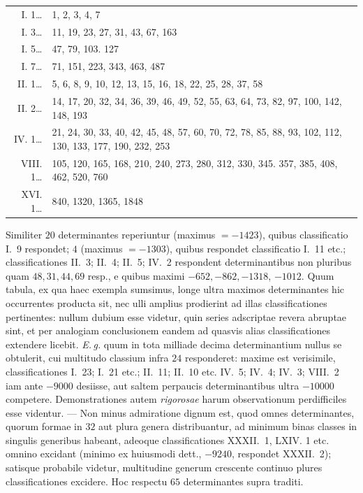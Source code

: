 \begin{center}\begin{tabularx}{\textwidth}{@{}r@{\quad}X@{}}
I. 1\;\ldots & 1, 2, 3, 4, 7\\[2pt]
I. 3\;\ldots & 11, 19, 23, 27, 31, 43, 67, 163\\[2pt]
I. 5\;\ldots & 47, 79, 103. 127\\[2pt]
I. 7\;\ldots & 71, 151, 223, 343, 463, 487\\[2pt]
II. 1\;\ldots & 5, 6, 8, 9, 10, 12, 13, 15, 16, 18, 22, 25, 28, 37, 58\\[2pt]
II. 2\;\ldots & 14, 17, 20, 32, 34, 36, 39, 46, 49, 52, 55, 63, 64, 73, 82, 97, 100, 142, 148, 193\\[2pt]
IV. 1\;\ldots & 21, 24, 30, 33, 40, 42, 45, 48, 57, 60, 70, 72, 78, 85, 88, 93, 102, 112, 130, 133, 177, 190, 232, 253\\[2pt]
VIII. 1\;\ldots & 105, 120, 165, 168, 210, 240, 273, 280, 312, 330, 345. 357, 385, 408, 462, 520, 760\\[2pt]
XVI. 1\;\ldots & 840, 1320, 1365, 1848\\[2pt]
\end{tabularx}\end{center}
Similiter \(20\) determinantes reperiuntur (maximus \(=-1423\)), quibus classificatio I.~9 respondet; \(4\) (maximus \(=-1303\)), quibus respondet classificatio I.~11 etc.; classificationes II.~3; II.~4; II.~5; IV.~2 respondent determinantibus non pluribus quam \(48,31,44,69\) resp., e quibus maximi \(-652,-862,-1318\), \(-1012\). Quum tabula, ex qua haec exempla sumsimus, longe ultra maximos determinantes hic occurrentes producta sit, nec ulli amplius prodierint ad illas classificationes pertinentes: nullum dubium esse videtur, quin series adscriptae revera abruptae sint, et per analogiam conclusionem eandem ad quasvis alias classificationes extendere licebit. \textit{E.\,g.} quum in tota milliade decima determinantium nullus se obtulerit, cui multitudo classium infra \(24\) responderet: maxime est verisimile, classificationes I.~23; I.~21 etc.; II.~11; II.~10 etc. IV.~5; IV.~4; IV.~3; VIII.~2 iam ante \(-9000\) desiisse, aut saltem perpaucis determinantibus ultra \(-10000\) competere. Demonstrationes autem \textit{rigorosae} harum observationum perdifficiles esse videntur. — Non minus admiratione dignum est, quod omnes determinantes, quorum formae in \(32\) aut plura genera distribuantur, ad minimum binas classes in singulis generibus habeant, adeoque classificationes XXXII.~1, LXIV. 1 etc. omnino excidant (minimo ex huiusmodi dett., \(-9240\), respondet XXXII.~2); satisque probabile videtur, multitudine generum crescente continuo plures classificationes excidere. Hoc respectu \(65\) determinantes supra traditi.
